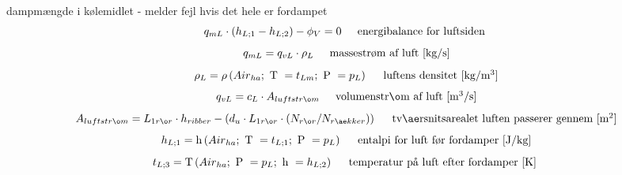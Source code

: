 \documentclass[../Hovedrapport.tex]{subfiles}
\newcommand{\F}[1]{\mbox{$#1$}}
\newcommand{\I}{\mbox{\hspace{0.20in}}}
\newcommand{\temperature}{\mathrm{T}}
\newcommand{\density}{\mathrm{\rho}}
\newcommand{\enthalpy}{\mathrm{h}}
\begin{document}
\vspace{0.10in}
\noindent
\rm dampmængde i kølemidlet - melder fejl hvis det hele er fordampet
\begin{equation}
\label{EES Eqn:72}
q_{mL} \cdot   \left( h_{L;1} - h_{L;2} \right)  - \phi_{V} = 0	 
\mbox{\I energibalance for luftsiden }
\end{equation}
\begin{equation}
\label{EES Eqn:73}
q_{mL} = q_{vL} \cdot  \rho_{L	} 
\mbox{\I massestrøm af luft [kg/s]}
\end{equation}
\begin{equation}
\label{EES Eqn:74}
\rho_{L} = \density \left(\F{Air}_{ha};\mbox{\ T }= t_{Lm};\mbox{\ P }= p_{L} \right) 	 
\mbox{\I luftens densitet [kg/m$^{3}$]}
\end{equation}
\begin{equation}
\label{EES Eqn:75}
q_{vL} = c_{L} \cdot  A_{luftstrøm	} 
\mbox{\I volumenstrøm af luft [m$^{3}$/s]}
\end{equation}
\begin{equation}
\label{EES Eqn:76}
A_{luftstrøm} = L_{1rør} \cdot  h_{ribber} -  \left( d_{u}\cdot L_{1rør} \cdot   \left( N_{rør}/N_{rækker} \right)  \right)  
\mbox{\I tværsnitsarealet luften passerer gennem [m$^{2}$]}
\end{equation}
\begin{equation}
\label{EES Eqn:77}
h_{L;1} = \enthalpy \left(\F{Air}_{ha};\mbox{\ T }= t_{L;1};\mbox{\ P }= p_{L} \right) 	 
\mbox{\I entalpi for luft før fordamper [J/kg]}
\end{equation}
\begin{equation}
\label{EES Eqn:78}
t_{L;3} = \temperature \left(\F{Air}_{ha};\mbox{\ P }= p_{L};\mbox{\ h }= h_{L;2} \right) 	 
\mbox{\I temperatur på luft efter fordamper [K] }
\end{equation}
\end{document}
